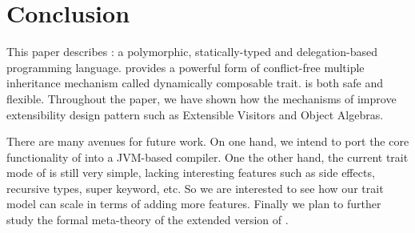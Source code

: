 \section{Conclusion}

This paper describes \name: a polymorphic, statically-typed and delegation-based
programming language. \name provides a powerful form of conflict-free multiple
inheritance mechanism called dynamically composable trait. \name is both safe
and flexible. Throughout the paper, we have shown how the mechanisms of \name
improve extensibility design pattern such as Extensible Visitors and Object
Algebras.

There are many avenues for future work. On one hand, we intend to port the core
functionality of \name into a JVM-based compiler. One the other hand, the
current trait mode of \name is still very simple, lacking interesting features
such as side effects, recursive types, super keyword, etc. So we are interested
to see how our trait model can scale in terms of adding more features. Finally
we plan to further study the formal meta-theory of the extended version of
\bname.
